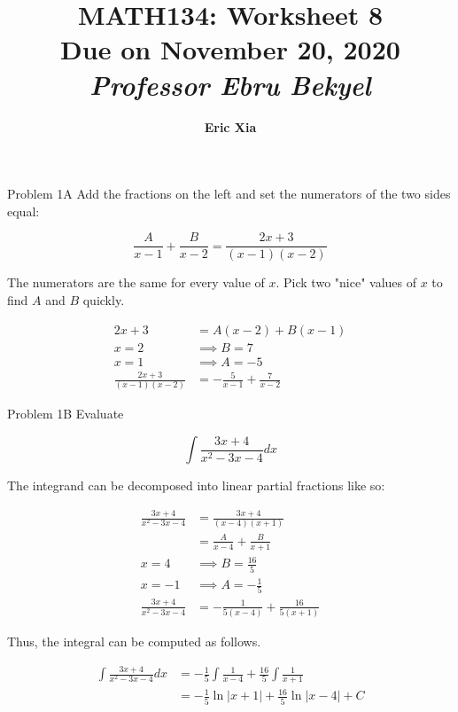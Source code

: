 \documentclass{article}
\title{
    \vspace{2in}
    \textmd{\textbf{MATH134: Worksheet 8}}\\
    \normalsize\vspace{0.1in}\small{Due on November 20, 2020}\\
    \vspace{0.1in}\large{\textit{Professor Ebru Bekyel}}
    \vspace{3in}
}
\author{\textbf{Eric Xia}}
\date{}
\begin{document}
    \maketitle
    \pagebreak

    \thispagestyle{2}



    \begin{tbhtheorem}{Problem 1A}
        Add the fractions on the left and set the numerators of the two sides equal:

        \[
            \frac{A}{x-1} + \frac{B}{x-2} = \frac{2x+3}{(x-1)(x-2)}
        \]

        The numerators are the same for every value of $x$. Pick two "nice" values of $x$ to find $A$ and $B$ quickly.
    \end{tbhtheorem}

    \begin{align*}
        2x+3    &= A(x-2) + B(x-1) \\
        x = 2   &\implies B = 7 \\
        x = 1   &\implies A = -5 \\
        \frac{2x+3}{(x-1)(x-2)} &= -\frac{5}{x-1} + \frac{7}{x-2}
    \end{align*}

    \begin{tbhtheorem}{Problem 1B}
        Evaluate

        \[
            \int \frac{3x+4}{x^2-3x-4}dx
        \]
    \end{tbhtheorem}

    The integrand can be decomposed into linear partial fractions like so:

    \begin{align*}
        \frac{3x+4}{x^2-3x-4}   &= \frac{3x+4}{(x-4)(x+1)} \\
                                &= \frac{A}{x-4} + \frac{B}{x+1} \\
        x = 4                   &\implies B = \frac{16}{5} \\
        x = -1                  &\implies A = -\frac{1}{5} \\
        \frac{3x+4}{x^2-3x-4}   &= -\frac{1}{5(x-4)} + \frac{16}{5(x+1)}
    \end{align*}

    Thus, the integral can be computed as follows.

    \begin{align*}
        \int \frac{3x+4}{x^2-3x-4}dx    &= -\frac{1}{5}\int \frac{1}{x-4} + \frac{16}{5}\int\frac{1}{x+1} \\
                                        &= -\frac{1}{5}\ln{|x+1|} + \frac{16}{5}\ln{|x-4|}+C
    \end{align*}
\end{document}
